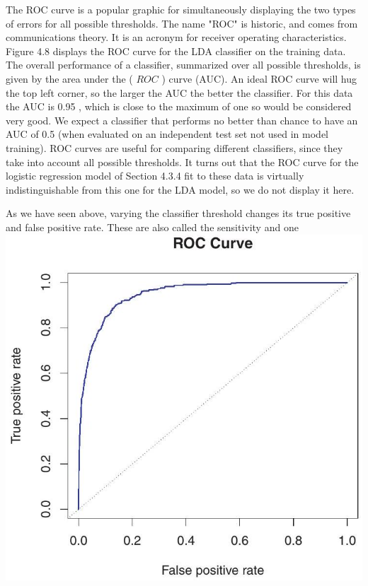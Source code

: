 \documentclass[10pt]{article}
\begin{document}
The ROC curve is a popular graphic for simultaneously displaying the two types of errors for all possible thresholds. The name "ROC" is historic, and comes from communications theory. It is an acronym for receiver operating characteristics. Figure 4.8 displays the ROC curve for the LDA classifier on the training data. The overall performance of a classifier, summarized over all possible thresholds, is given by the area under the ( $R O C$ ) curve (AUC). An ideal ROC curve will hug the top left corner, so the larger the AUC the better the classifier. For this data the AUC is 0.95 , which is close to the maximum of one so would be considered very good. We expect a classifier that performs no better than chance to have an AUC of 0.5 (when evaluated on an independent test set not used in model training). ROC curves are useful for comparing different classifiers, since they take into account all possible thresholds. It turns out that the ROC curve for the logistic regression model of Section 4.3.4 fit to these data is virtually indistinguishable from this one for the LDA model, so we do not display it here.

As we have seen above, varying the classifier threshold changes its true positive and false positive rate. These are also called the sensitivity and one\\
\includegraphics[max width=\textwidth, center]{2025_05_05_efe77898333945044de4g-163}
\end{document}
